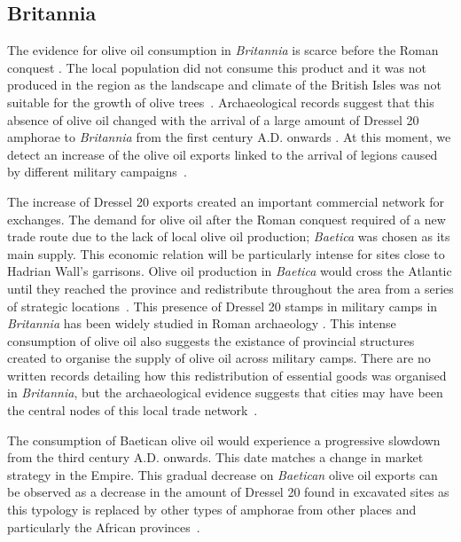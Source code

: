 \subsection{Britannia}
\label{sec:4}

The evidence for olive oil consumption in \textit{Britannia} is scarce before the Roman conquest \citep{funari_corpus_1996,carreras_abastecimiento_2003}. The local population did not consume this product and it was not produced in the region as the landscape and climate of the British Isles was not suitable for the growth of olive trees~\citep[161]{monfort_britanniaen_1998}. Archaeological records suggest that this absence of olive oil changed with the arrival of a large amount of Dressel 20 amphorae to \textit{Britannia} from the first century A.D. onwards \citep{peacock_amphorae_1991,carreras_britannia_1998}. At this moment, we detect an increase of the olive oil exports linked to the arrival of legions caused by different military campaigns~\citep[161]{monfort_britanniaen_1998}. 

The increase of Dressel 20 exports created an important commercial network for exchanges. The demand for olive oil after the Roman conquest required of a new trade route due to the lack of local olive oil production; \textit{Baetica} was chosen as its main supply. This economic relation will be particularly intense for sites close to Hadrian Wall's garrisons. Olive oil production in \textit{Baetica} would cross the Atlantic until they reached the province and redistribute throughout the area from a series of strategic locations~\citep{carreras_atlantic_2012}.  This presence of Dressel 20 stamps in military camps in \textit{Britannia} has been widely studied in Roman archaeology \citep{williams_importation_1983,funari_corpus_1996,carreras_britannia_1998,carreras_abastecimiento_2003}. This intense consumption of olive oil also suggests the existance of provincial structures created to organise the supply of olive oil across military camps. There are no written records detailing how this redistribution of essential goods was organised in \textit{Britannia}, but the archaeological evidence suggests that cities may have been the central nodes of this local trade network~\citep{funari_economic_2005,orengo_seeds_2016}. 

The consumption of Baetican olive oil would experience a progressive slowdown from the third century A.D. onwards. This date matches a change in market strategy in the Empire. This gradual decrease on \textit{Baetican} olive oil exports can be observed as a decrease in the amount of Dressel 20 found in excavated sites as this typology is replaced by other types of amphorae from other places and particularly the African provinces~\citep{rodriguez1991aceite,millet_anforas_1998}.

